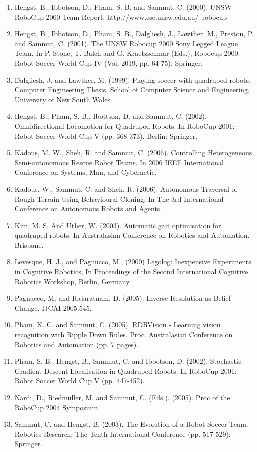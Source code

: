 \documentclass[runningheads,a4paper]{llncs}
\begin{document}
\begin{enumerate}
\item Hengst, B., Ibbotson, D., Pham, S. B. and Sammut, C. (2000). UNSW RoboCup 2000 Team Report. http://www.cse.unsw.edu.au/~robocup 
\item Hengst, B., Ibbotson, D., Pham, S. B., Dalgliesh, J., Lawther, M., Preston, P. and Sammut, C. (2001). The UNSW Robocup 2000 Sony Legged League Team. In P. Stone, T. Balch and G. Kraetzschmar (Eds.), Robocup 2000: Robot Soccer World Cup IV (Vol. 2019, pp. 64-75), Springer.
\item Dalgliesh, J. and Lawther, M. (1999). Playing soccer with quadruped robots. Computer Engineering Thesis, School of Computer Science and Engineering, University of New South Wales.
\item Hengst, B., Pham, S. B., Ibottson, D. and Sammut, C. (2002). Omnidirectional Locomotion for Quadruped Robots. In RoboCup 2001: Robot Soccer World Cup V (pp. 368-373). Berlin: Springer.
\item Kadous, M. W., Sheh, R. and Sammut, C. (2006). Controlling Heterogeneous Semi-autonomous Rescue Robot Teams. In 2006 IEEE International Conference on Systems, Man, and Cybernetic.
\item Kadous, W., Sammut, C. and Sheh, R. (2006). Autonomous Traversal of Rough Terrain Using Behavioural Cloning. In The 3rd International Conference on Autonomous Robots and Agents.
\item Kim, M. S. And Uther, W. (2003). Automatic gait optimisation for quadruped robots. In Australasian Conference on Robotics and Automation. Brisbane.
\item Levesque, H. J., and Pagnucco, M., (2000) Legolog: Inexpensive Experiments in Cognitive Robotics, In Proceedings of the Second International Cognitive Robotics Workshop, Berlin, Germany.
\item Pagnucco, M. and Rajaratnam, D. (2005): Inverse Resolution as Belief Change. IJCAI 2005.545.
\item Pham, K. C. and Sammut, C. (2005). RDRVision - Learning vision recognition with Ripple Down Rules. Proc. Australasian Conference on Robotics and Automation (pp. 7 pages).
\item Pham, S. B., Hengst, B., Sammut, C. and Ibbotson, D. (2002). Stochastic Gradient Descent Localisation in Quadruped Robots. In RoboCup 2001: Robot Soccer World Cup V (pp. 447-452). 
\item Nardi, D., Riedmuller, M. and Sammut, C. (Eds.). (2005). Proc of the RoboCup 2004 Symposium.
\item Sammut, C. and Hengst, B. (2003). The Evolution of a Robot Soccer Team. Robotics Research: The Tenth International Conference (pp. 517-529): Springer.

\end{enumerate}
\end{document}
